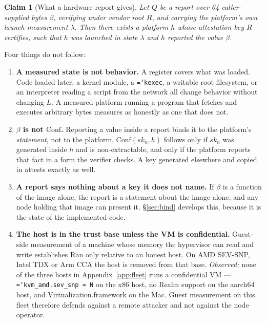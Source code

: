 \documentclass[11pt,a4paper]{article}
\newtheorem{claim}[definition]{Claim}
\newcommand{\code}[1]{\texttt{\hyphenchar\font=`\-\relax #1}}
\newcommand{\Ran}{\mathrm{Ran}}
\newcommand{\Conf}{\mathrm{Conf}}
\begin{document}
\begin{claim}[What a hardware report gives]\label{cl:att}
Let $Q$ be a report over 64 caller-supplied bytes $\beta$, verifying under vendor
root $R$, and carrying the platform's own launch measurement $\lambda$. Then
there exists a platform $h$ whose attestation key $R$ certifies, such that $h$
was launched in state $\lambda$ and $h$ reported the value $\beta$.
\end{claim}

Four things do not follow:

\begin{enumerate}[label=(\alph*)]
\item \textbf{A measured state is not behavior.} A register covers what was
  loaded. Code loaded later, a kernel module, a \code{kexec}, a writable root
  filesystem, or an interpreter reading a script from the network all change
  behavior without changing $L$. A measured platform running a program that
  fetches and executes arbitrary bytes measures as honestly as one that does not.

\item \textbf{$\beta$ is not $\Conf$.} Reporting a value inside a report binds it
  to the platform's \emph{statement}, not to the platform. $\Conf(sk_n, h)$
  follows only if $sk_n$ was generated inside $h$ and is non-extractable, and only
  if the platform reports that fact in a form the verifier checks. A key generated
  elsewhere and copied in attests exactly as well.

\item \textbf{A report says nothing about a key it does not name.} If $\beta$ is
  a function of the image alone, the report is a statement about the image alone,
  and any node holding that image can present it. \S\ref{sec:bind} develops this,
  because it is the state of the implemented code.

\item \textbf{The host is in the trust base unless the VM is confidential.}
  Guest-side measurement of a machine whose memory the hypervisor can read and
  write establishes $\Ran$ only relative to an honest host. On AMD SEV-SNP, Intel
  TDX or Arm CCA the host is removed from that base. \emph{Observed:} none of the
  three hosts in Appendix~\ref{app:fleet} runs a confidential VM ---
  \code{kvm\_amd.sev\_snp = N} on the x86 host, no Realm support on the aarch64
  host, and Virtualization.framework on the Mac. Guest measurement on this fleet
  therefore defends against a remote attacker and not against the node operator.
\end{enumerate}
\end{document}
